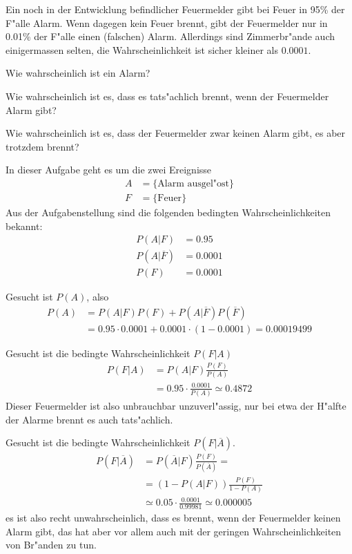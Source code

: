 Ein noch in der Entwicklung befindlicher Feuermelder gibt bei Feuer in 95\%
der F"alle Alarm. Wenn dagegen kein Feuer brennt, gibt der Feuermelder
nur in 0.01\% der F"alle einen (falschen) Alarm. Allerdings sind
Zimmerbr"ande auch einigermassen selten, die Wahrscheinlichkeit
ist sicher kleiner als $0.0001$.

\begin{teilaufgaben}
\item Wie wahrscheinlich ist ein Alarm?
\item Wie wahrscheinlich ist es, dass es tats"achlich brennt, wenn
der Feuermelder Alarm gibt?
\item Wie wahrscheinlich ist es, dass der Feuermelder zwar keinen
Alarm gibt, es aber trotzdem brennt?
\end{teilaufgaben}

\begin{loesung}
In dieser Aufgabe geht es um die zwei Ereignisse
\begin{align*}
A&=\{\text{Alarm ausgel"ost}\}
\\
F&=\{\text{Feuer}\}
\end{align*}
Aus der Aufgabenstellung sind die folgenden bedingten Wahrscheinlichkeiten
bekannt:
\begin{align*}
P(A|F)&=0.95
\\
P(A|\overline F)&=0.0001
\\
P(F)&=0.0001
\end{align*}
\begin{teilaufgaben}
\item Gesucht ist $P(A)$, also
\begin{align*}
P(A)&=P(A|F)P(F)+P(A|\overline F)P(\overline F)
\\
&=0.95\cdot 0.0001+0.0001\cdot(1-0.0001)= 0.00019499
\end{align*}
\item
Gesucht ist die bedingte Wahrscheinlichkeit $P(F|A)$
\begin{align*}
P(F|A)
&=
P(A|F) \frac{P(F)}{P(A)}
\\
&=0.95\cdot\frac{0.0001}{P(A)}\simeq0.4872
\end{align*}
Dieser Feuermelder ist also unbrauchbar unzuverl"assig, nur bei etwa der
H"alfte der Alarme brennt es auch tats"achlich.
\item Gesucht ist die bedingte Wahrscheinlichkeit $P(F|\overline A)$.
\begin{align*}
P(F|\overline A)
&=
P(\overline A|F)\frac{P(F)}{P(\overline A)}=
\\
&=
(1-P(A|F))\frac{P(F)}{1-P(A)}
\\
&\simeq
0.05\cdot \frac{0.0001}{0.99981}
\simeq
0.000005
\end{align*}
es ist also recht unwahrscheinlich, dass es brennt,
wenn der Feuermelder keinen Alarm gibt, das hat aber vor allem auch
mit der geringen Wahrscheinlichkeiten von Br"anden zu tun.
\qedhere
\end{teilaufgaben}
\end{loesung}

